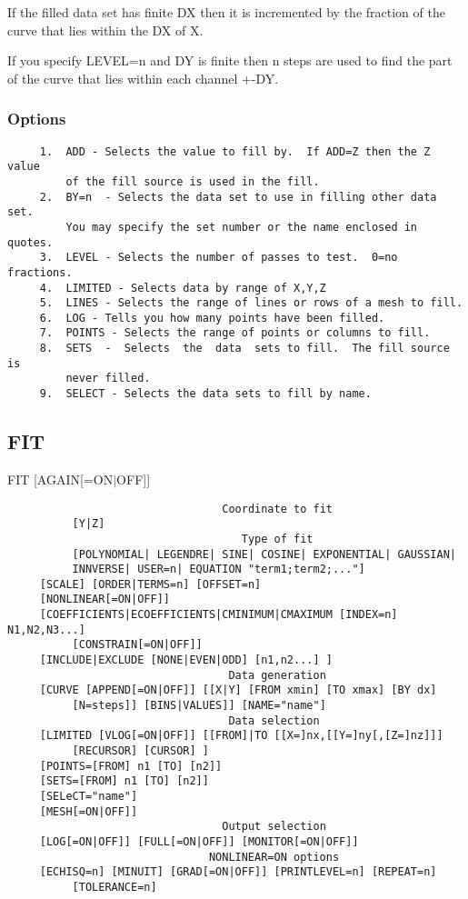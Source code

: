 If  the  filled  data  set  has  finite  DX then it is incremented by the
fraction of the curve that lies within the DX of X.  

If you specify LEVEL=n and DY is finite then n steps are used to find the
part of the curve that lies within each channel +-DY.  
\subsubsection{Options}
\begin{verbatim}
     1.  ADD - Selects the value to fill by.  If ADD=Z then the Z value
         of the fill source is used in the fill.  
     2.  BY=n  - Selects the data set to use in filling other data set.
         You may specify the set number or the name enclosed in quotes. 
     3.  LEVEL - Selects the number of passes to test.  0=no fractions. 
     4.  LIMITED - Selects data by range of X,Y,Z 
     5.  LINES - Selects the range of lines or rows of a mesh to fill. 
     6.  LOG - Tells you how many points have been filled.  
     7.  POINTS - Selects the range of points or columns to fill.  
     8.  SETS  -  Selects  the  data  sets to fill.  The fill source is
         never filled.  
     9.  SELECT - Selects the data sets to fill by name.  
\end{verbatim}
\subsection{FIT}
FIT [AGAIN[=ON$|$OFF]] 
\begin{verbatim}
                                 Coordinate to fit
          [Y|Z] 
                                    Type of fit
          [POLYNOMIAL| LEGENDRE| SINE| COSINE| EXPONENTIAL| GAUSSIAN|
          INNVERSE| USER=n| EQUATION "term1;term2;..."] 
     [SCALE] [ORDER|TERMS=n] [OFFSET=n] 
     [NONLINEAR[=ON|OFF]] 
     [COEFFICIENTS|ECOEFFICIENTS|CMINIMUM|CMAXIMUM [INDEX=n] N1,N2,N3...]
          [CONSTRAIN[=ON|OFF]] 
     [INCLUDE|EXCLUDE [NONE|EVEN|ODD] [n1,n2...] ] 
                                  Data generation
     [CURVE [APPEND[=ON|OFF]] [[X|Y] [FROM xmin] [TO xmax] [BY dx]
          [N=steps]] [BINS|VALUES]] [NAME="name"] 
                                  Data selection
     [LIMITED [VLOG[=ON|OFF]] [[FROM]|TO [[X=]nx,[[Y=]ny[,[Z=]nz]]]
          [RECURSOR] [CURSOR] ] 
     [POINTS=[FROM] n1 [TO] [n2]] 
     [SETS=[FROM] n1 [TO] [n2]] 
     [SELeCT="name"] 
     [MESH[=ON|OFF]] 
                                 Output selection
     [LOG[=ON|OFF]] [FULL[=ON|OFF]] [MONITOR[=ON|OFF]] 
                               NONLINEAR=ON options
     [ECHISQ=n] [MINUIT] [GRAD[=ON|OFF]] [PRINTLEVEL=n] [REPEAT=n]
          [TOLERANCE=n] 
\end{verbatim}

